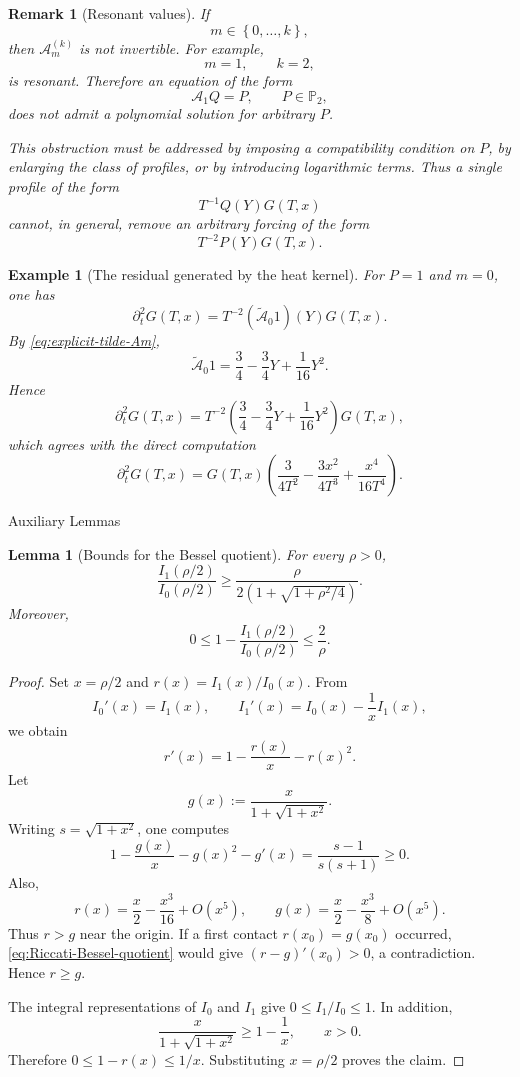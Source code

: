 \documentclass[11pt]{amsart}
\makeatletter
\newtheorem{lemma}{Lemma}[section]
\newtheorem{Example}{Example}[section]
\newtheorem{remark}{Remark}[section]
\theoremstyle{definition}
\theoremstyle{remark}
\numberwithin{equation}{section}
\newcommand{\set}[1]{\left\{#1\right\}}
\def\section{\@startsection{section}{1}%
  \z@{1.5\linespacing\@plus\linespacing}{.5\linespacing}%
  {\normalfont\bfseries\large\centering}}
\makeatother
\begin{document}
\begin{remark}[Resonant values]
\label{rem:Am-resonant-values}
If
\[
m\in\set{0,\ldots,k},
\]
then $\mathcal A_m^{(k)}$ is not invertible. For example,
\[
m=1,
\qquad
k=2,
\]
is resonant. Therefore an equation of the form
\[
\mathcal A_1Q=P,
\qquad
P\in\mathbb P_2,
\]
does not admit a polynomial solution for arbitrary $P$.

This obstruction must be addressed by imposing a compatibility
condition on $P$, by enlarging the class of profiles, or by introducing
logarithmic terms. Thus a single profile of the form
\[
T^{-1}Q(Y)G(T,x)
\]
cannot, in general, remove an arbitrary forcing of the form
\[
T^{-2}P(Y)G(T,x).
\]
\end{remark}

\begin{Example}[The residual generated by the heat kernel]
\label{ex:heat-kernel-residual-polynomial}
For $P=1$ and $m=0$, one has
\[
\partial_t^2G(T,x)
=
T^{-2}
(\widetilde{\mathcal A}_0 1)(Y)G(T,x).
\]
By \eqref{eq:explicit-tilde-Am},
\[
\widetilde{\mathcal A}_0 1
=
\frac34-\frac34Y+\frac1{16}Y^2.
\]
Hence
\[
\partial_t^2G(T,x)
=
T^{-2}
\left(
\frac34-\frac34Y+\frac1{16}Y^2
\right)
G(T,x),
\]
which agrees with the direct computation
\[
\partial_t^2G(T,x)
=
G(T,x)
\left(
\frac{3}{4T^2}
-\frac{3x^2}{4T^3}
+\frac{x^4}{16T^4}
\right).
\]
\end{Example}



\section{Auxiliary Lemmas}


\begin{lemma}[Bounds for the Bessel quotient]
\label{lem:lower-bound-Bessel-quotient}
For every $\rho>0$,
\[
\frac{I_1(\rho/2)}{I_0(\rho/2)}
\geq
\frac{\rho}{2\left(1+\sqrt{1+\rho^2/4}\right)}.
\]
Moreover,
\[
0\leq
1-\frac{I_1(\rho/2)}{I_0(\rho/2)}
\leq\frac{2}{\rho}.
\]
\end{lemma}

\begin{proof}
Set $x=\rho/2$ and $r(x)=I_1(x)/I_0(x)$. From
\[
I_0'(x)=I_1(x),
\qquad
I_1'(x)=I_0(x)-\frac1xI_1(x),
\]
we obtain
\begin{equation}\label{eq:Riccati-Bessel-quotient}
r'(x)=1-\frac{r(x)}x-r(x)^2.
\end{equation}
Let
\[
g(x):=\frac{x}{1+\sqrt{1+x^2}}.
\]
Writing $s=\sqrt{1+x^2}$, one computes
\[
1-\frac{g(x)}x-g(x)^2-g'(x)
=
\frac{s-1}{s(s+1)}\geq0.
\]
Also,
\[
r(x)=\frac x2-\frac{x^3}{16}+O(x^5),
\qquad
g(x)=\frac x2-\frac{x^3}{8}+O(x^5).
\]
Thus $r>g$ near the origin. If a first contact $r(x_0)=g(x_0)$
occurred, \eqref{eq:Riccati-Bessel-quotient} would give
$(r-g)'(x_0)>0$, a contradiction. Hence $r\geq g$.

The integral representations of $I_0$ and $I_1$ give
$0\leq I_1/I_0\leq1$. In addition,
\[
\frac{x}{1+\sqrt{1+x^2}}\geq1-\frac1x,
\qquad x>0.
\]
Therefore $0\leq1-r(x)\leq1/x$. Substituting $x=\rho/2$ proves the
claim.
\end{proof}
\end{document}
